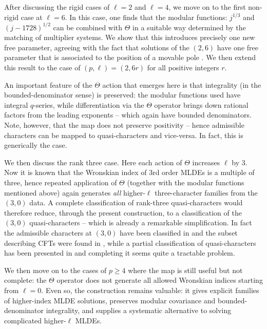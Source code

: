 \documentclass[11pt]{article}
\begin{document}
After discussing the rigid cases of \(\ell=2\) and \(\ell=4\), we move on to the first non-rigid case at \(\ell=6\). In this case, one finds that the modular functions: \(j^{1/3}\) and \((j-1728)^{1/2}\) can be combined with $\Theta$ in a suitable way determined by the matching of multiplier systems. We show that this introduces precisely one new free parameter, agreeing with the fact that solutions of the $(2,6)$ have one free parameter \cite{Chandra:2018pjq} that is associated to the position of a movable pole \cite{Das:2023qns}. We then extend this result to the case of $(p,\ell)=(2,6r)$ for all positive integers $r$. 

An important feature of the $\Theta$ action that emerges here is that integrality (in the bounded-denominator sense) is preserved: the modular functions used have integral \(q\)-series, while differentiation via the $\Theta$ operator brings down rational factors from the leading exponents -- which again have bounded denominators. Note, however, that the map does not preserve positivity -- hence admissible characters can be mapped to quasi-characters and vice-versa. In fact, this is generically the case.

We then discuss the rank three case. Here each action of $\Theta$ increases $\ell$ by 3. Now it is known \cite{Kaidi:2021ent} that the Wronskian index of 3rd order MLDEs is a multiple of three, hence repeated application of \(\Theta\) (together with the modular functions mentioned above) again generates {\em all} higher-\(\ell\) three-character families from the \((3,0)\) data. A complete classification of rank-three quasi-characters would therefore reduce, through the present construction, to a classification of the \((3,0)\) quasi-characters -- which is already a remarkable simplification. In fact the admissible characters at $(3,0)$ have been classified in \cite{Kaidi:2021ent, Das:2021uvd, Bae:2021mej} and the subset describing CFTs were found in \cite{Das:2022uoe}, while a partial classification of quasi-characters has been presented in \cite{Mukhi:2020gnj} and completing it seems quite a tractable problem.

We then move on to the cases of $p\ge 4$ where the map is still useful but not complete: the $\Theta$ operator does not generate all allowed Wronskian indices starting from $\ell=0$. Even so, the construction remains valuable: it gives explicit families of higher-index MLDE solutions, preserves modular covariance and bounded-denominator integrality, and supplies a systematic alternative to solving complicated higher-\(\ell\) MLDEs.
\end{document}
